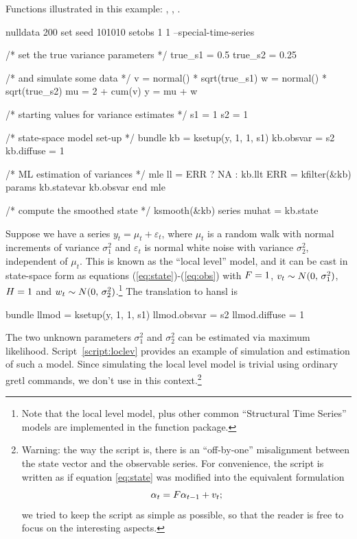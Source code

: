 Functions illustrated in this example: , ,
.

\begin{script}[htbp]
  \label{script:loclev}
\begin{scode}
nulldata 200
set seed 101010
setobs 1 1 --special-time-series

/* set the true variance parameters */
true_s1 = 0.5
true_s2 = 0.25

/* and simulate some data */
v = normal() * sqrt(true_s1)
w = normal() * sqrt(true_s2)
mu = 2 + cum(v)
y = mu + w

/* starting values for variance estimates */
s1 = 1
s2 = 1

/* state-space model set-up */
bundle kb = ksetup(y, 1, 1, s1)
kb.obsvar = s2
kb.diffuse = 1

/* ML estimation of variances */
mle ll = ERR ? NA : kb.llt
    ERR = kfilter(&kb)
    params kb.statevar kb.obsvar
end mle

/* compute the smoothed state */
ksmooth(&kb)
series muhat = kb.state
\end{scode}
\end{script}

Suppose we have a series $y_t = \mu_t + \varepsilon_t$, where $\mu_t$
is a random walk with normal increments of variance $\sigma^2_1$ and
$\varepsilon_t$ is normal white noise with variance $\sigma^2_2$,
independent of $\mu_t$. This is known as the ``local level'' model,
and it can be cast in state-space form as equations
(\ref{eq:state})-(\ref{eq:obs}) with $F = 1$, $v_t \sim
N(0,\, \sigma^2_1)$, $H = 1$ and $w_t \sim N(0,\,
\sigma^2_2)$.\footnote{Note that the local level model, plus other
  common ``Structural Time Series'' models are implemented in the
   function package.} The translation to \textsf{hansl}
is 
\begin{code}
bundle llmod = ksetup(y, 1, 1, s1)
llmod.obsvar = s2
llmod.diffuse = 1
\end{code}

The two unknown parameters $\sigma^2_1$ and $\sigma^2_2$ can be
estimated via maximum likelihood.  Script~\ref{script:loclev} provides
an example of simulation and estimation of such a model. Since
simulating the local level model is trivial using ordinary gretl
commands, we don't use  in this context.\footnote{Warning:
  the way the script is, there is an ``off-by-one'' misalignment
  between the state vector and the observable series. For convenience,
  the script is written as if equation \eqref{eq:state} was modified
  into the equivalent formulation
  \[
  \alpha_{t} = F \alpha_{t-1} + v_t ;
  \]
  we tried to keep the script as simple as possible, so that the
  reader is free to focus on the interesting aspects. }

